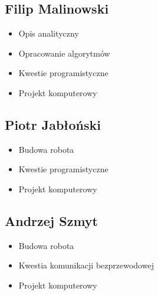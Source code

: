 \documentclass[a4paper]{article}
\begin{document}
    \subsection{Filip Malinowski}
        \begin{itemize}
            \item Opis analityczny
            \item Opracowanie algorytmów
            \item Kwestie programistyczne
            \item Projekt komputerowy
        \end{itemize}
    \subsection{Piotr Jabłoński}
        \begin{itemize}
            \item Budowa robota
            \item Kwestie programistyczne
            \item Projekt komputerowy
        \end{itemize}
    \subsection{Andrzej Szmyt}
        \begin{itemize}
            \item Budowa robota
            \item Kwestia komunikacji bezprzewodowej
            \item Projekt komputerowy
        \end{itemize}
        
\end{document}
